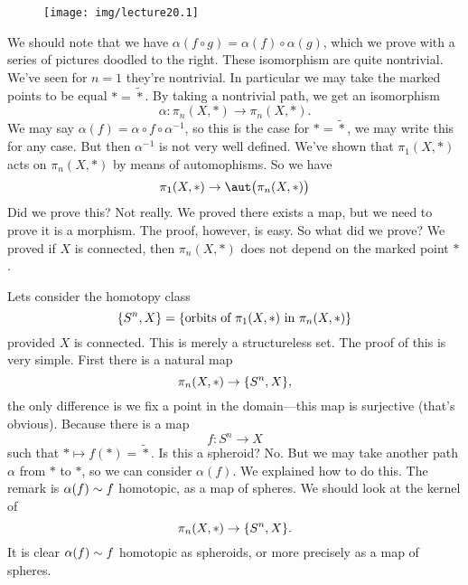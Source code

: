 \begin{wrapfigure}{r}{3.35in}
  \vspace{-20pt}
  \centering
  \texttt{[image: img/lecture20.1]}
\end{wrapfigure}
We should note that we have $\alpha(f\circ g)=\alpha(f)\circ\alpha(g)$, which
we prove with a series of pictures doodled to the right.
These isomorphism are quite nontrivial. We've seen for $n=1$
they're nontrivial. In particular we may take the marked points
to be equal $*=\widetilde{*}$. By taking a nontrivial path, we
get an isomorphism
\begin{equation}
\alpha\colon\pi_{n}(X,*)\to\pi_{n}(X,*).
\end{equation}
We may say $\alpha(f)=\alpha\circ f\circ\alpha^{-1}$, so this is
the case for $*=\widetilde{*}$, we may write this for any
case. But then $\alpha^{-1}$ is not very well defined. We've
shown that $\pi_{1}(X,*)$ acts on $\pi_{n}(X,*)$ by means of
automophisms. So we have
\begin{equation}
\pi_{1}(X,*)\to\aut\bigl(\pi_{n}(X,*)\bigr)
\end{equation}
Did we prove this? Not really. We proved there exists a map, but
we need to prove it is a morphism. The proof, however, is easy.
So what did we prove? We proved if $X$ is connected, then
$\pi_{n}(X,*)$ does not depend on the marked point $*$.


Lets consider the homotopy class
\begin{equation}\index{Orbit!in Homotopy Groups}
\homotopyClass(S^{n},X)=\{\mbox{orbits of $\pi_{1}(X,*)$ in $\pi_{n}(X,*)$}\}
\end{equation}
provided $X$ is connected. This is merely a structureless
set. The proof of this is very simple. First there is a natural
map
\begin{equation}
\pi_{n}(X,*)\to\homotopyClass(S^{n},X),
\end{equation}
the only difference is we fix a point in the domain---this map is
surjective (that's obvious). Because there is a map
\begin{equation}
f\colon S^{n}\to X
\end{equation}
such that $*\mapsto f(*)=\widetilde{*}$. Is this a spheroid?
No. But we may take another path $\alpha$ from $*$ to $*$, so we
can consider $\alpha(f)$. We explained how to do this. The remark
is $\alpha(f)\sim f$ homotopic, as a map of spheres. We
should look at the kernel of
\begin{equation}
\pi_{n}(X,*)\to\homotopyClass(S^{n},X).
\end{equation}
It is clear $\alpha(f)\sim f$ homotopic as spheroids, or
more precisely as a map of spheres.



